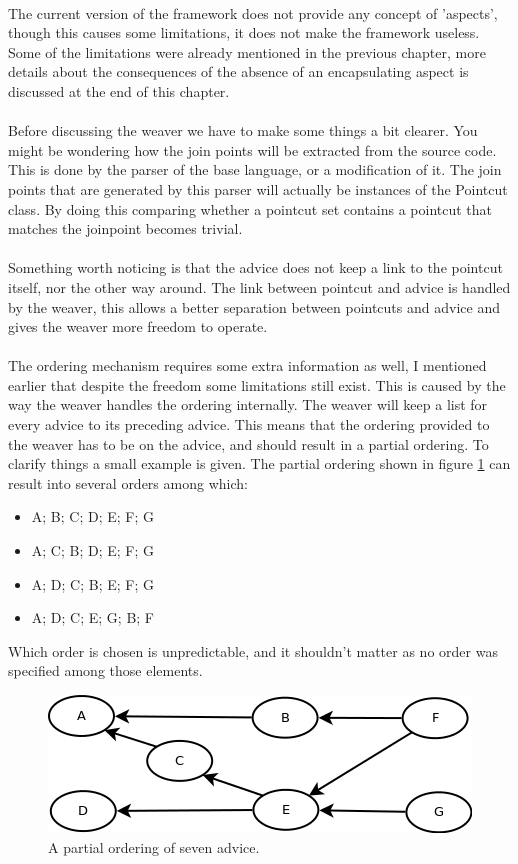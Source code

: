 \documentclass[a4paper]{report}
\begin{document}
\\
The current version of the framework does not provide any concept of 'aspects', though this causes some limitations, it does not make the framework useless. Some of the limitations were already mentioned in the previous chapter, more details about the consequences of the absence of an encapsulating aspect is discussed at the end of this chapter.\\
\\
Before discussing the weaver we have to make some things a bit clearer. You might be wondering how the join points will be extracted from the source code. This is done by the parser of the base language, or a modification of it. The join points that are generated by this parser will actually be instances of the Pointcut class. By doing this comparing whether a pointcut set contains a pointcut that matches the joinpoint becomes trivial.\\
\\
Something worth noticing is that the advice does not keep a link to the pointcut itself, nor the other way around. The link between pointcut and advice is handled by the weaver, this allows a better separation between pointcuts and advice and gives the weaver more freedom to operate.\\
\\
The ordering mechanism requires some extra information as well, I mentioned earlier that despite the freedom some limitations still exist. This is caused by the way the weaver handles the ordering internally. The weaver will keep a list for every advice to its preceding advice. This means that the ordering provided to the weaver has to be on the advice, and should result in a partial ordering. To clarify things a small example is given. The partial ordering shown in figure \ref{fig:Order} can result into several orders among which:
\begin{itemize}
\item A; B; C; D; E; F; G
\item A; C; B; D; E; F; G
\item A; D; C; B; E; F; G
\item A; D; C; E; G; B; F
\end{itemize}
Which order is chosen is unpredictable, and it shouldn't matter as no order was specified among those elements.\\
\begin{figure}[h!]
\centering
\includegraphics[scale=0.6]{images/AOF/Order.png}
\caption{A partial ordering of seven advice.}
\label{fig:Order}
\end{figure}\\
\end{document}
